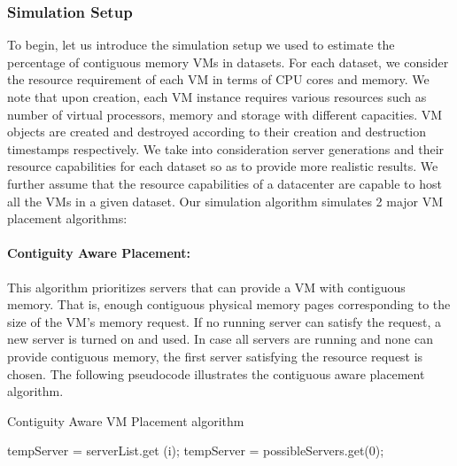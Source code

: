 \documentclass[sigconf]{sigplanconf}
\begin{document}
      \subsubsection{Simulation Setup}
      To begin, let us introduce the simulation setup we used to estimate the percentage of contiguous memory VMs in datasets. For each dataset, we consider the resource requirement of each VM in terms of CPU cores and memory. We note that upon creation, each VM instance requires various resources such as number of virtual processors, memory and storage with different capacities. VM objects are created and destroyed according to their creation and destruction timestamps respectively. We take into consideration server generations and their resource capabilities for each dataset so as to provide more realistic results. We further assume that the resource capabilities of a datacenter are capable to host all the VMs in a given dataset.
      Our simulation algorithm simulates 2 major VM placement algorithms:
      \paragraph{Contiguity Aware Placement:}
      This algorithm prioritizes servers that can provide a VM with contiguous memory. That is, enough contiguous physical memory pages corresponding to the size of the VM's memory request. If no running server can satisfy the request, a new server is turned on and used. In case all servers are running and none can provide contiguous memory, the first server satisfying the resource request is chosen. The following pseudocode illustrates the contiguous aware placement algorithm.
      
      \begin{algorithm}  
      	\caption{Contiguity Aware VM Placement algorithm} 
      	\label{cont_aware}
      	\begin{algorithmic}[5]  
      		\Statex  
      		
      		\State tempServer = serverList.get (i);
      		\State {}
      		\EndIf  
      		\EndFor  
      		\State tempServer = possibleServers.get(0);
      		\EndIf
      		\State {}  
      		\EndFunction  
      	\end{algorithmic}  
      \end{algorithm}
      
\end{document}
